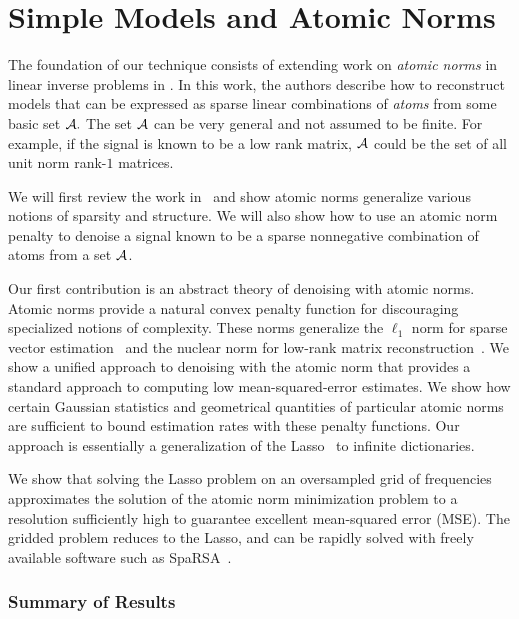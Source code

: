 \chapter{Simple Models and Atomic Norms}

The foundation of our technique consists of extending work on \emph{atomic
norms} in linear inverse problems in \cite{crpw}. In this work, the authors
describe how to reconstruct models that can be expressed as sparse linear
combinations of \emph{atoms} from some basic set $\mathcal{A}.$ The set $\mathcal{A}$ can be very
general and not assumed to be finite. For example, if the signal is known to be
a low rank matrix, $\mathcal{A}$ could be the set of all unit norm rank-$1$ matrices.

We will first review the work in~\cite{crpw} and show atomic norms generalize
various notions of sparsity and structure.  We will also show how to use an
atomic norm penalty to denoise a signal known to be a sparse nonnegative
combination of atoms from a set $\mathcal{A}$.

Our first contribution is an abstract theory of denoising with atomic norms.
Atomic norms provide a natural convex penalty function for discouraging
specialized notions of complexity. These norms generalize the $\ell_1$ norm
for sparse vector estimation~\cite{candes06} and the nuclear norm for low-rank
matrix reconstruction~\cite{Recht10,CandesRecht09}. We show a unified approach
to denoising with the atomic norm that provides a standard approach to
computing low mean-squared-error estimates. We show how certain Gaussian
statistics and geometrical quantities of particular atomic norms are
sufficient to bound estimation rates with these penalty functions. Our
approach is essentially a generalization of the
Lasso~\cite{tibshirani96,chen98} to infinite dictionaries.

We show that solving the Lasso problem on an oversampled grid of frequencies
approximates the solution of the atomic norm minimization problem to a
resolution sufficiently high to guarantee excellent mean-squared error (MSE).
The gridded problem reduces to the Lasso, and can be rapidly solved with freely
available software such as SpaRSA~\cite{wright09}.

\subsection{Summary of Results}

